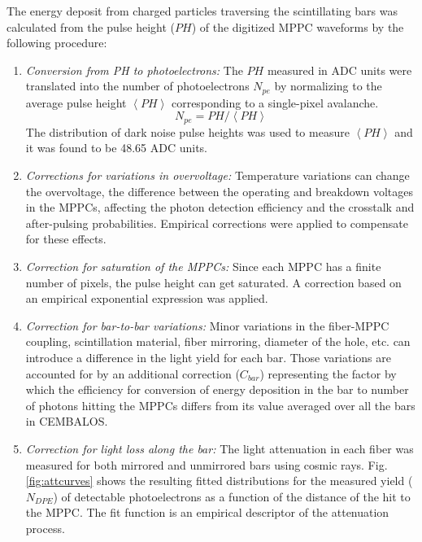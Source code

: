 The energy deposit from charged particles traversing the scintillating bars was calculated from the pulse height ($PH$) of the digitized MPPC waveforms by the following procedure:

\begin{enumerate}
\item {\it Conversion from PH to photoelectrons:} The $PH$ measured in ADC units were translated into the number of photoelectrons $N_{pe}$ by normalizing to the average pulse height $\left\langle PH \right\rangle$ corresponding to a single-pixel avalanche. 
\begin{equation}
N_{pe} = PH/\left\langle PH \right\rangle
\end{equation}
The distribution of dark noise pulse heights was used to measure $\left\langle PH \right\rangle$ and it was found to be 48.65 ADC units. 
\item{\it Corrections for variations in overvoltage:} Temperature variations can change the overvoltage, the difference between the operating and breakdown voltages in the MPPCs, affecting the photon detection efficiency and the crosstalk and after-pulsing probabilities. Empirical corrections were applied to compensate for these effects.
\item{\it Correction for saturation of the MPPCs:} Since each MPPC has a finite number of pixels, the pulse height can get saturated. A correction based on an empirical exponential expression was applied.
\item{\it Correction for bar-to-bar variations:} Minor variations in the fiber-MPPC coupling, scintillation material, fiber mirroring, diameter of the hole, etc. can introduce a difference in the light yield for each bar. Those variations are accounted {\color{red}for} by an additional correction {\color{red}($C_{bar}$)} representing the factor by which the efficiency for conversion of energy deposition in the bar to number of photons hitting the MPPCs differs from its value averaged over all the bars in CEMBALOS.
\item{\it Correction for light loss along the bar: } The light attenuation in each fiber was measured for both mirrored and unmirrored bars using cosmic rays. Fig. \ref{fig:attcurves} shows the resulting fitted distributions for the measured yield ($N_{DPE}$) of detectable photoelectrons as a function of the distance of the hit to the MPPC. The fit function is an empirical descriptor of the attenuation process.
\begin{figure}[!h]
\begin{center}

\end{center}
\end{figure}
\end{enumerate}
